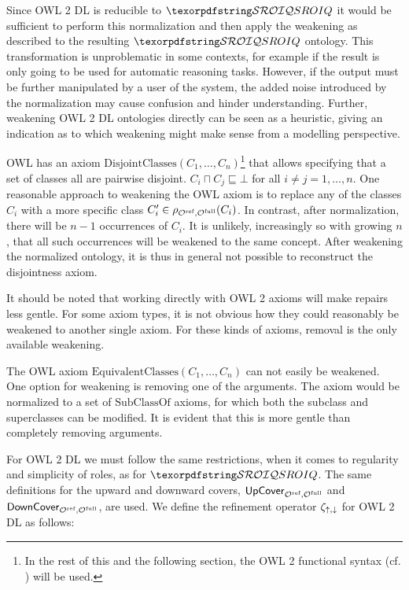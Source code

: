 Since OWL 2 DL is reducible to $\SROIQ$ it would be sufficient to perform this normalization and then apply the weakening as described to the resulting $\SROIQ$ ontology. This transformation is unproblematic in some contexts, for example if the result is only going to be used for automatic reasoning tasks. However, if the output must be further manipulated by a user of the system, the added noise introduced by the normalization may cause confusion and hinder understanding. Further, weakening OWL 2 DL ontologies directly can be seen as a heuristic, giving an indication as to which weakening might make sense from a modelling perspective.

\begin{example}
  OWL has an axiom $\mathrm{DisjointClasses}(C_1, \dots, C_n)$\footnote{In the rest of this and the following section, the OWL 2 functional syntax (cf. \cite{motik2012ontology}) will be used.} that allows specifying that a set of classes all are pairwise disjoint. $C_i \sqcap C_j \sqsubseteq \bot$ for all $i \not= j = 1, \dots, n$. One reasonable approach to weakening the OWL axiom is to replace any of the classes $C_i$ with a more specific class $C_i' \in \rho_{{\mathcal{O}^\textnormal{ref}},{\mathcal{O}^\textnormal{full}}}(C_i)$. In contrast, after normalization, there will be $n - 1$ occurrences of $C_i$. It is unlikely, increasingly so with growing $n$, that all such occurrences will be weakened to the same concept. After weakening the normalized ontology, it is thus in general not possible to reconstruct the disjointness axiom.
\end{example}

It should be noted that working directly with OWL 2 axioms will make repairs less gentle. For some axiom types, it is not obvious how they could reasonably be weakened to another single axiom. For these kinds of axioms, removal is the only available weakening.

\begin{example}
  The OWL axiom $\mathrm{EquivalentClasses}(C_1, \dots, C_n)$ can not easily be weakened. One option for weakening is removing one of the arguments. The axiom would be normalized to a set of $\mathrm{SubClassOf}$ axioms, for which both the subclass and superclasses can be modified. It is evident that this is more gentle than completely removing arguments.
\end{example}

For OWL 2 DL we must follow the same restrictions, when it comes to regularity and simplicity of roles, as for $\SROIQ$. The same definitions for the upward and downward covers, ${\mathsf{UpCover}}_{{\mathcal{O}^\textnormal{ref}},{\mathcal{O}^\textnormal{full}}}$ and ${\mathsf{DownCover}}_{{\mathcal{O}^\textnormal{ref}},{\mathcal{O}^\textnormal{full}}}$, are used. We define the refinement operator $\zeta_{\mathop{\uparrow},\mathop{\downarrow}}$ for OWL 2 DL as follows:

